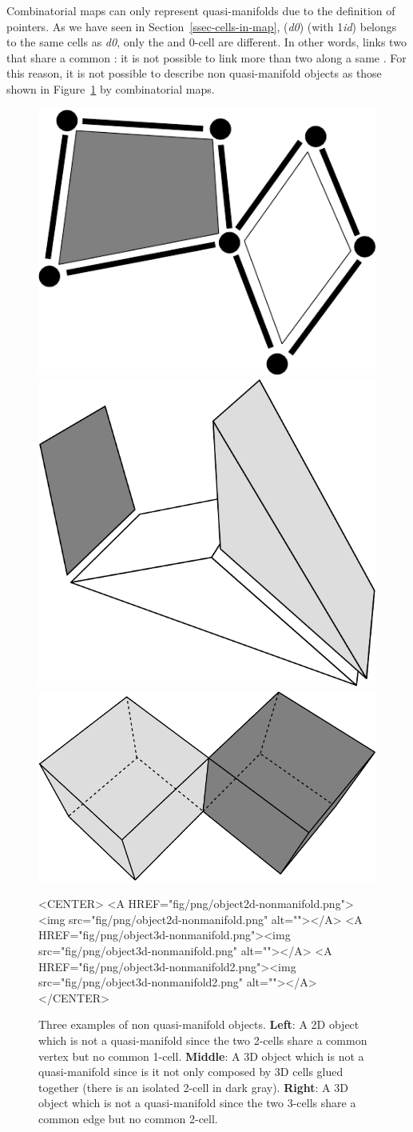 Combinatorial maps can only represent quasi-manifolds due to the
definition of \betats{} pointers. As we have seen in
Section~\ref{ssec-cells-in-map}, \betai{}(\emph{d0}) (with 1\myleq{}\emph{i}\myleq{}\emph{d})
belongs to the same cells as \emph{d0}, only the  and 0-cell are
different. In other words, \betai{} links two  that
share a common : it is not possible to link more than two
 along a same .
For this reason, it is not possible to describe non quasi-manifold
objects as those shown in Figure~\ref{fig-nonquasi-manifold} by
combinatorial maps.
%
\begin{figure}[ht]
  \begin{ccTexOnly}
    \begin{center}
      \includegraphics[width=.22\textwidth]
      {Combinatorial_map/fig/pdf/object2d-nonmanifold}
      \qquad
      \includegraphics[width=.3\textwidth]
      {Combinatorial_map/fig/pdf/object3d-nonmanifold}
      \qquad
      \includegraphics[width=.35\textwidth]
      {Combinatorial_map/fig/pdf/object3d-nonmanifold2}
    \end{center}
  \end{ccTexOnly}
  \begin{ccHtmlOnly}
    <CENTER>
    <A HREF="fig/png/object2d-nonmanifold.png"><img src="fig/png/object2d-nonmanifold.png" alt=""></A>
    <A HREF="fig/png/object3d-nonmanifold.png"><img src="fig/png/object3d-nonmanifold.png" alt=""></A>
    <A HREF="fig/png/object3d-nonmanifold2.png"><img src="fig/png/object3d-nonmanifold2.png" alt=""></A>
    </CENTER>
    \end{ccHtmlOnly}
    \caption{Three examples of non quasi-manifold
      objects. \textbf{Left}: A 2D object which is not a
      quasi-manifold since the two 2-cells share a common vertex but
      no common 1-cell.  \textbf{Middle}: A 3D object which is not a
      quasi-manifold since is it not only composed by 3D cells glued
      together (there is an isolated 2-cell in dark
      gray). \textbf{Right}: A 3D object which is not a quasi-manifold
      since the two 3-cells share a common edge but no common 2-cell.
    }
    \label{fig-nonquasi-manifold}
\end{figure}
